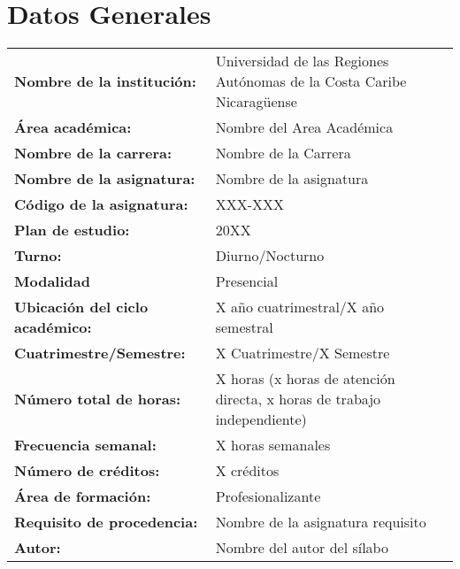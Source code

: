 \section{Datos Generales}

\begin{center}
    \begin{doublespace}
        \begin{tabular}{ p{} p{} }
            \textbf{Nombre de la institución:}      & Universidad de las Regiones Autónomas de la Costa Caribe Nicaragüense   \\
            \textbf{Área académica:}                & Nombre del Area Académica                                               \\
            \textbf{Nombre de la carrera:}          & Nombre de la Carrera                                                    \\
            \textbf{Nombre de la asignatura:}       & Nombre de la asignatura                                                 \\
            \textbf{Código de la asignatura:}       & XXX-XXX                                                                 \\
            \textbf{Plan de estudio:}               & 20XX                                                                    \\
            \textbf{Turno:}                         & Diurno/Nocturno                                                         \\
            \textbf{Modalidad}                      & Presencial                                                              \\
            \textbf{Ubicación del ciclo académico:} & X año cuatrimestral/X año semestral                                     \\
            \textbf{Cuatrimestre/Semestre:}         & X Cuatrimestre/X Semestre                                               \\
            \textbf{Número total de horas:}         & X horas (x horas de atención directa, x horas de trabajo independiente) \\
            \textbf{Frecuencia semanal:}            & X horas semanales                                                       \\
            \textbf{Número de créditos:}            & X créditos                                                              \\
            \textbf{Área de formación:}             & Profesionalizante                                                       \\
            \textbf{Requisito de procedencia:}      & Nombre de la asignatura requisito                                       \\
            \textbf{Autor:}                         & Nombre del autor del sílabo                                             \\
        \end{tabular}
    \end{doublespace}
\end{center}